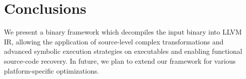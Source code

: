 \vspace{-4ex}
\section{Conclusions}
\label{sec:conclusions}
We present a binary framework which decompiles the input binary into LLVM IR, allowing the application of source-level complex transformations and advanced symbolic execution strategies on executables and enabling functional source-code recovery. In future, we plan to extend our framework for various platform-specific optimizations.
